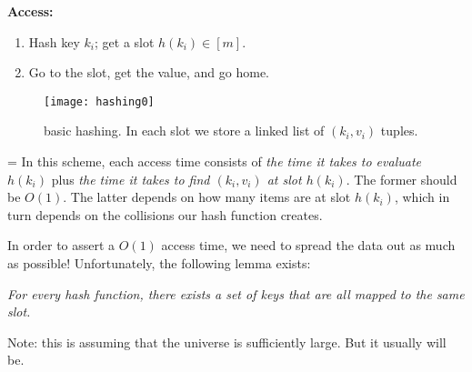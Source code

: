 \documentclass[11pt]{article}
\begin{document}
\textbf{Access:}
\begin{enumerate}
\item Hash key $k_i$; get a slot $h(k_i) \in [m]$.
\item Go to the slot, get the value, and go home.
\end{enumerate}

\newpage

\begin{figure}[h]
\centering
\texttt{[image: hashing0]}
\caption{basic hashing. In each slot we store a linked list of $(k_i, v_i)$ tuples.}
\end{figure}

{\parskip=\baselineskip
In this scheme, each access time consists of \textit{the time it takes to evaluate $h(k_i)$} plus \textit{the time it takes to find $(k_i, v_i)$ at slot $h(k_i)$}. The former should be $O(1)$. The latter depends on how many items are at slot $h(k_i)$, which in turn depends on the collisions our hash function creates.

In order to assert a $O(1)$ access time, we need to spread the data out as much as possible! Unfortunately, the following lemma exists:
}

\begin{flushright}
\textit{For every hash function, there exists a set of keys that are all mapped to the same slot.}
\end{flushright}

Note: this is assuming that the universe is sufficiently large. But it usually will be.
\end{document}
